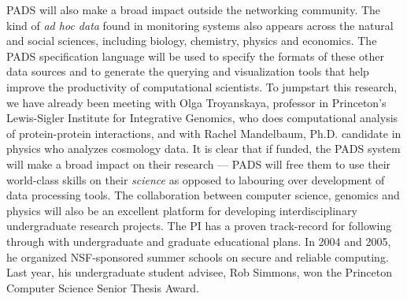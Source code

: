 PADS will also make a broad impact outside the networking community.
The kind of {\em ad hoc data} found in monitoring systems also appears
across the natural and social sciences, including biology, chemistry,
physics and economics.  The PADS specification language will be used to
specify the formats of these other data sources and to generate the
querying and visualization tools that help improve
the productivity of computational scientists.  To jumpstart this
research, we have already been meeting with Olga Troyanskaya,
professor in Princeton's Lewis-Sigler Institute for Integrative
Genomics, who does computational analysis of protein-protein
interactions, and with Rachel Mandelbaum, Ph.D. candidate in physics
who analyzes cosmology data.  It is clear that if funded, the PADS system
will make a broad impact on their research --- PADS will free them to use
their world-class skills on their {\em science} 
as opposed to labouring over development of data processing tools.
The collaboration between computer science, genomics and physics will
also be an excellent platform for developing interdisciplinary
undergraduate research projects.  The PI has a proven track-record for
following through with undergraduate and graduate educational plans.
In 2004 and 2005, he organized NSF-sponsored summer schools on secure
and reliable computing.  Last year, his undergraduate student advisee,
Rob Simmons, won the Princeton Computer Science Senior Thesis Award.

